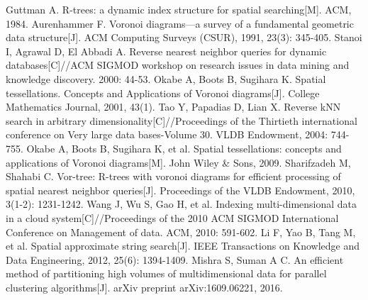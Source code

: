 \documentclass{ML}
\begin{document}
\appendix

\begin{thebibliography}{20}
     Guttman A. R-trees: a dynamic index structure for spatial searching[M]. ACM, 1984.
     Aurenhammer F. Voronoi diagrams—a survey of a fundamental geometric data structure[J]. ACM Computing Surveys (CSUR), 1991, 23(3): 345-405.
     Stanoi I, Agrawal D, El Abbadi A. Reverse nearest neighbor queries for dynamic databases[C]//ACM SIGMOD workshop on research issues in data mining and knowledge discovery. 2000: 44-53.
     Okabe A, Boots B, Sugihara K. Spatial tessellations. Concepts and Applications of Voronoi diagrams[J]. College Mathematics Journal, 2001, 43(1).
     Tao Y, Papadias D, Lian X. Reverse kNN search in arbitrary dimensionality[C]//Proceedings of the Thirtieth international conference on Very large data bases-Volume 30. VLDB Endowment, 2004: 744-755.
     Okabe A, Boots B, Sugihara K, et al. Spatial tessellations: concepts and applications of Voronoi diagrams[M]. John Wiley \& Sons, 2009.
     Sharifzadeh M, Shahabi C. Vor-tree: R-trees with voronoi diagrams for efficient processing of spatial nearest neighbor queries[J]. Proceedings of the VLDB Endowment, 2010, 3(1-2): 1231-1242.
     Wang J, Wu S, Gao H, et al. Indexing multi-dimensional data in a cloud system[C]//Proceedings of the 2010 ACM SIGMOD International Conference on Management of data. ACM, 2010: 591-602.
     Li F, Yao B, Tang M, et al. Spatial approximate string search[J]. IEEE Transactions on Knowledge and Data Engineering, 2012, 25(6): 1394-1409.
     Mishra S, Suman A C. An efficient method of partitioning high volumes of multidimensional data for parallel clustering algorithms[J]. arXiv preprint arXiv:1609.06221, 2016.
\end{thebibliography}
\end{document}
